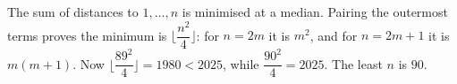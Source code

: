 The sum of distances to $1,\ldots,n$ is minimised at a median. Pairing the outermost terms proves the minimum is $\lfloor \dfrac{n^2}{4}\rfloor$: for $n=2m$ it is $m^2$, and for $n=2m+1$ it is $m(m+1)$. Now $\lfloor\dfrac{89^2}{4}\rfloor=1980<2025$, while $\dfrac{90^2}{4}=2025$. The least $n$ is $\boxed{90}$.
